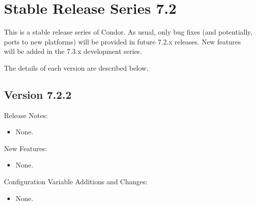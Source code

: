 
\section{\label{sec:History-7-2}Stable Release Series 7.2}

This is a stable release series of Condor.
As usual, only bug fixes (and potentially, ports to new platforms)
will be provided in future 7.2.x releases.
New features will be added in the 7.3.x development series.

The details of each version are described below.


\subsection*{\label{sec:New-7-2-2}Version 7.2.2}

\noindent Release Notes:

\begin{itemize}

\item None.

\end{itemize}


\noindent New Features:

\begin{itemize}

\item None.

\end{itemize}

\noindent Configuration Variable Additions and Changes:

\begin{itemize}

\item None.

\end{itemize}

